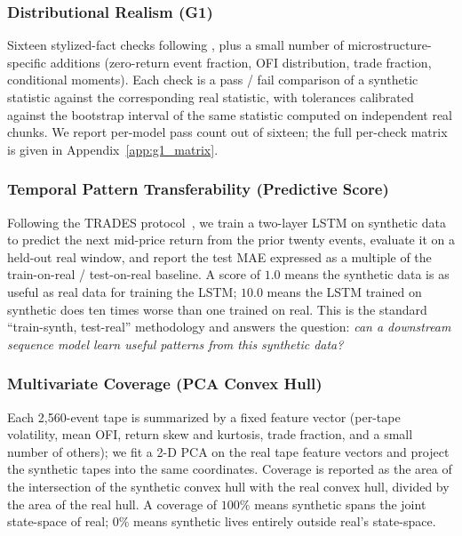 \documentclass[journal]{IEEEtran}
\theoremstyle{definition}   %
\begin{document}
\subsubsection{Distributional Realism (G1)}
\label{sec:eval_g1}

Sixteen stylized-fact checks following \cite{cont2001stylized}, plus a
small number of microstructure-specific additions (zero-return event
fraction, OFI distribution, trade fraction, conditional moments).
Each check is a pass / fail comparison of a synthetic statistic against
the corresponding real statistic, with tolerances calibrated against
the bootstrap interval of the same statistic computed on independent
real chunks. We report per-model pass count out of sixteen; the full
per-check matrix is given in Appendix~\ref{app:g1_matrix}.

\subsubsection{Temporal Pattern Transferability (Predictive Score)}
\label{sec:eval_predictive}

Following the TRADES protocol~\cite{berti2025trades}, we train a
two-layer LSTM on synthetic data to predict the next mid-price return
from the prior twenty events, evaluate it on a held-out real window,
and report the test MAE expressed as a multiple of the
train-on-real / test-on-real baseline. A score of $1.0$ means the
synthetic data is as useful as real data for training the LSTM;
$10.0$ means the LSTM trained on synthetic does ten times worse than
one trained on real. This is the standard ``train-synth, test-real''
methodology and answers the question: \emph{can a downstream sequence
model learn useful patterns from this synthetic data?}

\subsubsection{Multivariate Coverage (PCA Convex Hull)}
\label{sec:eval_pca}

Each 2{,}560-event tape is summarized by a fixed feature vector
(per-tape volatility, mean OFI, return skew and kurtosis, trade
fraction, and a small number of others); we fit a 2-D PCA on the real
tape feature vectors and project the synthetic tapes into the same
coordinates. Coverage is reported as the area of the intersection of
the synthetic convex hull with the real convex hull, divided by the
area of the real hull. A coverage of $100\%$ means synthetic spans the
joint state-space of real; $0\%$ means synthetic lives entirely outside
real's state-space.
\end{document}
